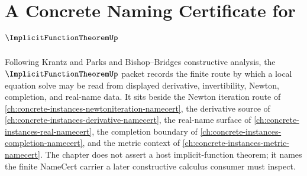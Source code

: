 \chapter{A Concrete Naming Certificate for $\ImplicitFunctionTheoremUp$}
\label{ch:concrete-instances-implicit-function-theorem-namecert}

Following Krantz and Parks and Bishop--Bridges constructive analysis, the $\ImplicitFunctionTheoremUp$ packet records the finite route by which a local equation solve may be read from displayed derivative, invertibility, Newton, completion, and real-name data. It sits beside the Newton iteration route of \autoref{ch:concrete-instances-newtoniteration-namecert}, the derivative source of \autoref{ch:concrete-instances-derivative-namecert}, the real-name surface of \autoref{ch:concrete-instances-real-namecert}, the completion boundary of \autoref{ch:concrete-instances-completion-namecert}, and the metric context of \autoref{ch:concrete-instances-metric-namecert}. The chapter does not assert a host implicit-function theorem; it names the finite NameCert carrier a later constructive calculus consumer must inspect.


